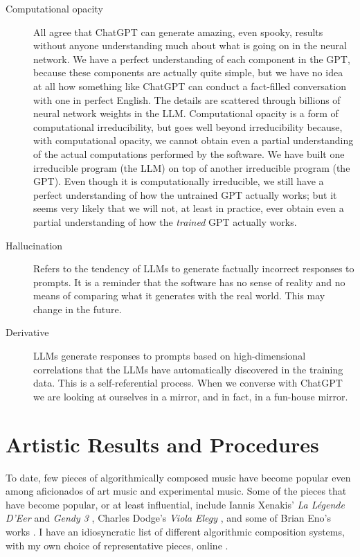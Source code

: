 \documentclass[11pt]{scrartcl}
\begin{document}
\begin{description}
\item[Computational opacity] All agree that ChatGPT can generate amazing, even spooky, results without anyone understanding much about what is going on in the neural network. We have a perfect understanding of each component in the GPT, because these components are actually quite simple, but we have no idea at all how something like ChatGPT can conduct a fact-filled conversation with one in perfect English. The details are scattered through billions of neural network weights in the LLM. Computational opacity is a form of computational irreducibility, but goes well beyond irreducibility because, with computational opacity, we cannot obtain even a partial understanding of the actual computations performed by the software. We have built one irreducible program (the LLM) on top of another irreducible program (the GPT). Even though it is computationally irreducible, we still have a perfect understanding of how the untrained GPT actually works; but it seems very likely that we will not, at least in practice, ever obtain even a partial understanding of how the  \emph{trained} GPT actually works.
\item [Hallucination] Refers to the tendency of LLMs to generate factually incorrect responses to prompts. It is a reminder that the software has no sense of reality and no means of comparing what it generates with the real world. This may change in the future.
\item [Derivative] LLMs generate responses to prompts based on high-dimensional correlations that the LLMs have automatically discovered in the training data. This is a self-referential process. When we converse with ChatGPT we are looking at ourselves in a mirror, and in fact, in a fun-house mirror.
\end{description}

\section{Artistic Results and Procedures}

To date, few pieces of algorithmically composed music have become popular even among aficionados of art music and experimental music. Some of the pieces that have become popular, or at least influential, include Iannis Xenakis' \emph{La Légende D'Eer} \cite{Solr-8143160} and \emph{Gendy 3} \cite{gendy3},  Charles Dodge's \emph{Viola Elegy} \cite{violaelegy}, and some of Brian Eno's works \cite{eno1996generative, enochilvers}. I have an idiosyncratic list of different algorithmic composition systems, with my own choice of representative pieces, online \cite{rant}.
\end{document}
